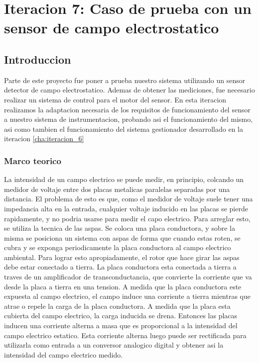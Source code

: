 \chapter{Iteracion 7: Caso de prueba con un sensor de campo electrostatico} %
\label{cha:iteracion_7}

\section{Introduccion} %
\label{sec:introduccion}

Parte de este proyecto fue poner a prueba nuestro sistema utilizando un sensor detector de campo electrostatico. Ademas de obtener las mediciones, fue necesario realizar un sistema de control para el motor del sensor. En esta iteracion realizamos la adaptacion necesaria de los requisitos de funcionamiento del sensor a nuestro sistema de instrumentacion, probando asi el funcionamiento del mismo, asi como tambien el funcionamiento del sistema gestionador desarrollado en la iteracion \ref{cha:iteracion_6} 

\subsection{Marco teorico} %
\label{sub:marco_teorico}

La intensidad de un campo electrico se puede medir, en principio, colcando un medidor de voltaje entre dos placas metalicas paralelas separadas por una distancia. El problema de esto es que, como el medidor de voltaje suele tener una impedancia alta en la entrada, cualquier voltaje inducido en las placas se pierde rapidamente, y no podria usarse para medir el capo electrico. Para arreglar esto, se utiliza la tecnica de las aspas. Se coloca una placa conductora, y sobre la misma se posiciona un sistema con aspas de forma que cuando estas roten, se cubra y se exponga periodicamente la placa conductora al campo electrico ambiental. Para lograr esto apropiadamente, el rotor que hace girar las aspas debe estar conectado a tierra. La placa conductora esta conectada a tierra a traves de un amplificador de transconductancia, que convierte la corriente que va desde la placa a tierra en una tension.
A medida que la placa conductora este expuesta al campo electrico, el campo induce una corriente a tierra mientras que atrae o repele la carga de la placa conductora. A medida que la placa esta cubierta del campo electrico, la carga inducida se drena. Entonces las placas inducen una corriente alterna a masa que es proporcional a la intensidad del campo electrico estatico. Esta corriente alterna luego puede ser rectificada para utilizarla como entrada a un conversor analogico digital y obtener asi la intensidad del campo electrico medido. \\

